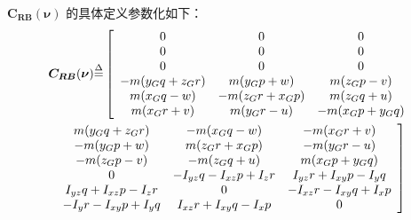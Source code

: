 ${\bm{C_{RB}}(\bm{\nu})}$ 的具体定义参数化如下：
\begin{multline}
\label{eq:chap2:14}
\bm{C_{RB}}(\bm{\nu})
{\buildrel \Delta \over =}
  \left[\begin{array}{ccc}
0 & 0 & 0 \\
0 & 0 & 0 \\
0 & 0 & 0 \\
-m(y_G q + z_G r) & m(y_G p+w)   & m(z_G p - v) \\
m(x_G q - w) & -m(z_G r + x_G p)  &  m(z_G q+u) \\
m(x_G r + v) &  m(y_G r - u) & -m(x_G p + y_G q) \\
\end{array}\right.\\
\left.\begin{array}{ccc}
  m(y_G q + z_G r) & -m(x_G q - w)   & -m(x_G r + v)   \\
  -m(y_G p +w)     & m(z_G r +x_G p) & -m(y_G r - u)  \\
 -m(z_G p - v)    & -m(z_G q + u)   & m(x_G p + y_G q)  \\
 0  & -I_{yz}q-I_{xz}p+I_z r &  I_{yz}r +I_{xy}p - I_y q   \\
 I_{yz}q+I_{xz}p - I_z r & 0 & -I_{xz}r - I_{xy}q + I_{x}p \\
 -I_y r - I_{xy}p +I_y q & I_{xz}r+I_{xy}q-I_x p &  0 \\
\end{array}\right]
\end{multline}

